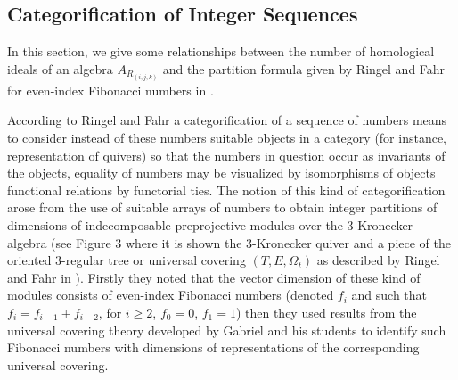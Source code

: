 \documentclass[10pt,twoside]{article}
\theoremstyle{definition}
\begin{document}
\subsection{Categorification of Integer Sequences}\label{categorification}
In this section, we give some relationships between the number of homological ideals of an algebra $A_{R_{(i, j, k)}}$ and the partition formula given by Ringel and Fahr for even-index Fibonacci numbers in \cite{Fahr1}.\par\bigskip
According to Ringel and Fahr \cite{Fahr2} a categorification of a sequence of
numbers means to consider instead of these numbers suitable objects in a category (for instance, representation of quivers) so that the numbers in question occur as invariants of the objects, equality of numbers may be visualized by isomorphisms of objects functional relations by functorial ties.  The notion of this kind of categorification arose from  the use of suitable arrays of numbers to obtain integer partitions of dimensions of indecomposable preprojective modules over the 3-Kronecker algebra (see Figure 3 where it is shown the 3-Kronecker quiver and a piece of the oriented 3-regular tree or universal covering $(T,E,\Omega_{t})$ as described by Ringel and Fahr in \cite{Fahr1}). Firstly they noted that  the vector dimension of these kind of modules consists of even-index Fibonacci numbers (denoted $f_{i}$ and such that $f_{i}=f_{i-1}+f_{i-2}$, for $i\geq2$, $f_{0}=0$, $f_1=1$) then they used results from the universal covering theory developed by Gabriel and his students to identify such Fibonacci numbers with dimensions of representations of the corresponding universal covering.
\end{document}
